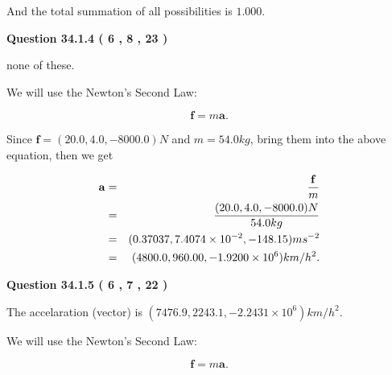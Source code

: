 \documentclass[12pt]{article}
\begin{document}
\noindent
 And the total summation of all possibilities is $  %
1.000 $.
 
 
 
  
\vspace{0.2in}
  
{\textbf{\Large{Question
34.1.4 
 (           6 ,           8 ,          23 )
}}}
  
  
 
 
\noindent{}
 
 
none of these.
 
 
 
 
 
 
\noindent{}

We will use the Newton's Second Law:
 
\[
\mathbf{f}=m\mathbf{a}.
\]
 
Since $\mathbf{f}=( %
20.0,  %
4.0,  %
-8000.0 )N$
and $m= %
54.0kg$, bring them into the above equation, then we get
 
\begin{eqnarray*}
\mathbf{a}&=&\frac{\mathbf{f}}m  \\
&=&\frac{(
20.0 ,
4.0 ,
-8000.0 )N
}{ %
54.0 kg}  \\
&=&(
0.37037 ,
7.4074 \times 10^{-2},
-148.15
)ms^{-2} \\
&=&(
4800.0 ,
960.00 ,
-1.9200 \times 10^{6}
)km/h^2.
\end{eqnarray*}
 
 
 
  
\vspace{0.2in}
  
{\textbf{\Large{Question
34.1.5 
 (           6 ,           7 ,          22 )
}}}
  
  
 
 
\noindent{}
 
 
The accelaration (vector) is
$(
7476.9,
2243.1 ,
-2.2431 \times 10^{6}
)km/h^2.
$
 
 
 
 
 
 
\noindent{}

We will use the Newton's Second Law:
 
\[
\mathbf{f}=m\mathbf{a}.
\]
 
\end{document}
